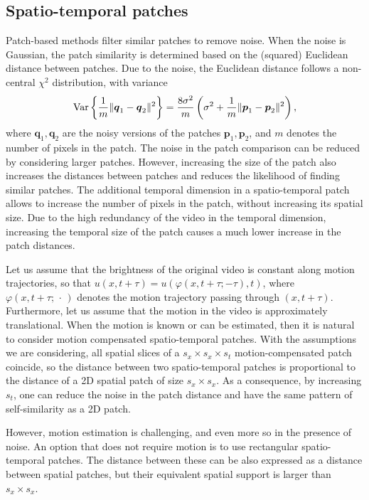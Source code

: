 \documentclass[10pt, journal, twocolumn, final, a4paper]{IEEEtran}
\newcommand{\ma}[1]{\boldsymbol{#1}}
\begin{document}
\subsection{Spatio-temporal patches}
\label{sse:spatio-temporal-patches}
Patch-based methods filter similar patches to remove noise. When the noise is
Gaussian, the patch similarity is determined based on the (squared) Euclidean distance 
between patches. Due to the noise, the Euclidean distance follows a non-central
$\chi^2$ distribution, with variance
\[\textnormal{Var}\left\{\frac1{m}\|\ma q_1 - \ma q_2\|^2\right\} = \frac{8\sigma^2}{m}\left(\sigma^2 + \frac1{m}\|\ma p_1 - \ma p_2\|^2\right),\]
where $\ma q_1, \ma q_2$ are the noisy versions of the patches $\ma p_1, \ma p_2$, 
and $m$ denotes the number of pixels in the patch. The noise in the patch comparison
can be reduced by considering larger patches.
However, increasing the size of the patch also increases the distances between
patches and reduces the likelihood of finding similar patches.
%
The additional temporal dimension in a spatio-temporal patch allows to increase
the number of pixels in the patch, without increasing its spatial size.
Due to the high redundancy of the video in the temporal dimension, increasing the 
temporal size of the patch causes a much lower increase in the patch distances.
%

Let us assume that 
the brightness of the original video is constant along motion trajectories, so
that $u(x,t + \tau) = u(\varphi(x,t + \tau; -\tau),t)$, where
$\varphi(x,t+\tau;\, \cdot\, )$ denotes the motion trajectory passing through
$(x,t + \tau)$.
Furthermore, let us assume that the motion in the video is approximately
translational.
When the motion is known or can be estimated, then it is natural to consider
motion compensated spatio-temporal patches. 
With the assumptions we are considering, all spatial slices of a $s_x\times s_x\times s_t$ motion-compensated patch
coincide, so the distance between two spatio-temporal patches is proportional to
the distance of a 2D spatial patch of size $s_x\times s_x$.
%
As a consequence, by increasing $s_t$, one can reduce the 
noise in the patch distance and have the same pattern of self-similarity as a 
2D patch.

However, motion estimation is challenging, and even more so in the presence of noise.
An option that does not require motion is to use rectangular spatio-temporal patches.
The distance between these can be also expressed as a distance between spatial patches,
but their equivalent spatial support is larger than $s_x\times s_x$.
\end{document}
